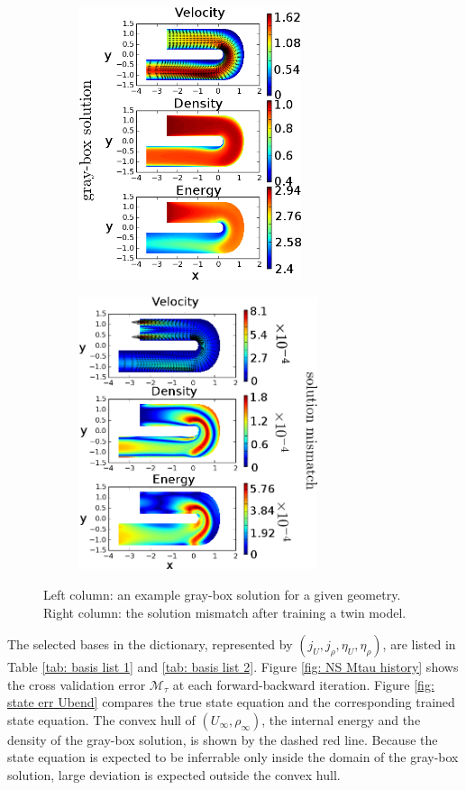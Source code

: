 
\begin{figure}[htbp]\begin{center}
    \begin{subfigure}[t]{.49\textwidth}
        \centering
        \includegraphics[height=8cm]{../graysol_Ubend.png}
        \label{fig: graysol Ubend}
    \end{subfigure}
    \begin{subfigure}[t]{.49\textwidth}
        \centering
        \includegraphics[height=8cm]{../err_Ubend.png}
        \label{fig: errsol Ubend}
    \end{subfigure}
    \caption{Left column: an example gray-box solution for a given geometry. Right column:
             the solution mismatch after training a twin model.}
    \label{fig: grayErrSol Ubend}
\end{center}\end{figure}

The selected bases in the
dictionary, represented by $(j_U, j_{\rho}, \eta_U, \eta_\rho)$, are listed in Table 
\ref{tab: basis list 1} and \ref{tab: basis list 2}. Figure \ref{fig: NS Mtau history}
shows the cross validation error $\mathcal{M}_{\tau}$ at each forward-backward iteration.
Figure \ref{fig: state err Ubend} compares the true state equation and the corresponding trained 
state equation. The convex hull of $({U}_\infty, \rho_\infty)$, the internal energy
and the density of the gray-box solution,
is shown by the dashed red line.
Because the state equation is expected to be inferrable only inside the domain of the gray-box 
solution, large deviation is expected outside the convex hull.\\


